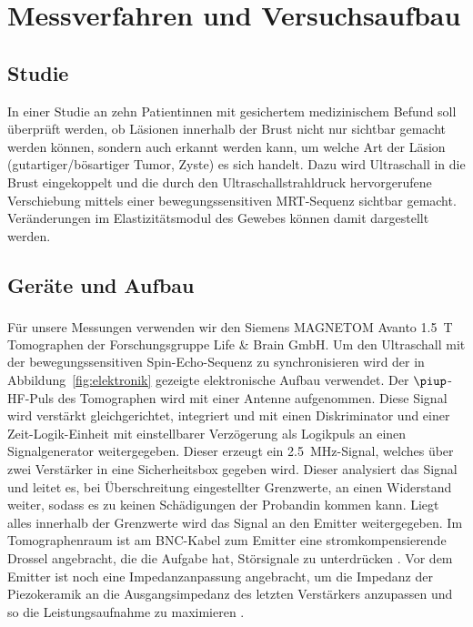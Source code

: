 \documentclass[
    11pt,
    ngerman
]{scrbook}
\begin{document}
\chapter{Messverfahren und Versuchsaufbau}

\section{Studie}

In einer Studie an zehn Patientinnen mit gesichertem medizinischem Befund soll
überprüft werden, ob Läsionen innerhalb der Brust nicht nur sichtbar gemacht
werden können, sondern auch erkannt werden kann, um welche Art der Läsion
(gutartiger/bösartiger Tumor, Zyste) es sich handelt. Dazu wird Ultraschall in
die Brust eingekoppelt und die durch den Ultraschallstrahldruck hervorgerufene
Verschiebung mittels einer bewegungssensitiven MRT-Sequenz sichtbar gemacht.
Veränderungen im Elastizitätsmodul des Gewebes können damit dargestellt werden.

\section{Geräte und Aufbau}

Für unsere Messungen verwenden wir den Siemens
\textsc{MAGNETOM}\textsuperscript{\textregistered} Avanto \SI{1.5}{\tesla}
Tomographen der Forschungsgruppe Life \& Brain GmbH. Um den Ultraschall mit der
bewegungssensitiven Spin-Echo-Sequenz zu synchronisieren wird der in
Abbildung~\ref{fig:elektronik} gezeigte elektronische Aufbau verwendet. Der
$\piup$-HF-Puls des Tomographen wird mit einer Antenne aufgenommen. Diese
Signal wird verstärkt gleichgerichtet, integriert und mit einen Diskriminator
und einer Zeit-Logik-Einheit mit einstellbarer Verzögerung als Logikpuls an
einen Signalgenerator weitergegeben. Dieser erzeugt ein
\SI{2.5}{\mega\hertz}-Signal, welches über zwei Verstärker in eine
Sicherheitsbox gegeben wird. Dieser analysiert das Signal und leitet es, bei
Überschreitung eingestellter Grenzwerte, an einen Widerstand weiter, sodass es
zu keinen Schädigungen der Probandin kommen kann. Liegt alles innerhalb der
Grenzwerte wird das Signal an den Emitter weitergegeben. Im Tomographenraum ist
am BNC-Kabel zum Emitter eine stromkompensierende Drossel angebracht, die die
Aufgabe hat, Störsignale zu unterdrücken \parencite{diss_radicke}. Vor dem
Emitter ist noch eine Impedanzanpassung angebracht, um die Impedanz der
Piezokeramik an die Ausgangsimpedanz des letzten Verstärkers anzupassen und so
die Leistungsaufnahme zu maximieren \parencite{dipl_kofahl}.
\end{document}
